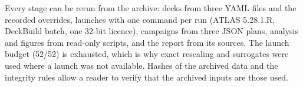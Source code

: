 \begin{keyresult}
Every stage can be rerun from the archive: decks from three YAML files and the recorded overrides, launches with one
command per run (ATLAS 5.28.1.R, DeckBuild batch, one 32-bit licence), campaigns from three JSON plans, analysis and
figures from read-only scripts, and the report from its sources. The launch budget (52/52) is exhausted, which is why
exact rescaling and surrogates were used where a launch was not available. Hashes of the archived data and the integrity
rules allow a reader to verify that the archived inputs are those used.
\end{keyresult}

